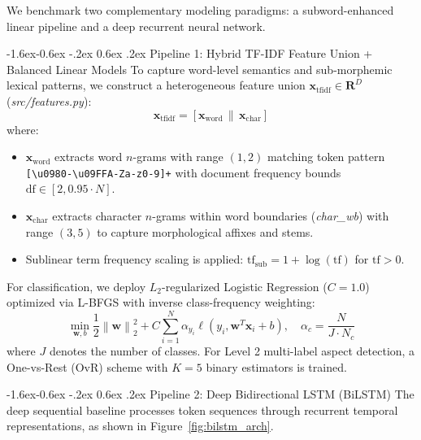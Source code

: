 \documentclass[12pt,a4paper]{article}
\makeatletter
\providecommand{\mathbf}[1]{\textbf{#1}}
\renewcommand{\texttt}[1]{\textit{#1}}
\newcommand{\norm}[1]{\left\|#1\right\|}
\renewcommand{\subsection}{\@startsection{subsection}{2}{\z@}%
  {-1.6ex\@plus -0.6ex \@minus -.2ex}%
  {0.6ex \@plus .2ex}%
  {\normalfont\Large\bfseries}}
\makeatother
\begin{document}
We benchmark two complementary modeling paradigms: a subword-enhanced linear pipeline and a deep recurrent neural network.

\subsection{Pipeline 1: Hybrid TF-IDF Feature Union + Balanced Linear Models}
To capture word-level semantics and sub-morphemic lexical patterns, we construct a heterogeneous feature union $\mathbf{x}_{\mathrm{tfidf}} \in \mathbf{R}^{D}$ (\texttt{src/features.py}):
\begin{equation}
    \mathbf{x}_{\mathrm{tfidf}} = \left[ \mathbf{x}_{\mathrm{word}} \,\|\, \mathbf{x}_{\mathrm{char}} \right]
\end{equation}
where:
\begin{itemize}
    \item $\mathbf{x}_{\mathrm{word}}$ extracts word $n$-grams with range $(1, 2)$ matching token pattern \verb|[\u0980-\u09FFA-Za-z0-9]+| with document frequency bounds $\mathrm{df} \in [2, 0.95 \cdot N]$.
    \item $\mathbf{x}_{\mathrm{char}}$ extracts character $n$-grams within word boundaries (\texttt{char\_wb}) with range $(3, 5)$ to capture morphological affixes and stems.
    \item Sublinear term frequency scaling is applied: $\mathrm{tf}_{\mathrm{sub}} = 1 + \log(\mathrm{tf})$ for $\mathrm{tf} > 0$.
\end{itemize}

For classification, we deploy $L_2$-regularized Logistic Regression ($C = 1.0$) optimized via L-BFGS with inverse class-frequency weighting:
\begin{equation}
    \min_{\mathbf{w}, b} \frac{1}{2}\norm{\mathbf{w}}_2^2 + C \sum_{i=1}^{N} \alpha_{y_i} \ell(y_i, \mathbf{w}^T \mathbf{x}_i + b), \quad \alpha_c = \frac{N}{J \cdot N_c}
\end{equation}
where $J$ denotes the number of classes. For Level 2 multi-label aspect detection, a One-vs-Rest (OvR) scheme with $K = 5$ binary estimators is trained.

\subsection{Pipeline 2: Deep Bidirectional LSTM (BiLSTM)}
The deep sequential baseline processes token sequences through recurrent temporal representations, as shown in Figure~\ref{fig:bilstm_arch}.
\end{document}
